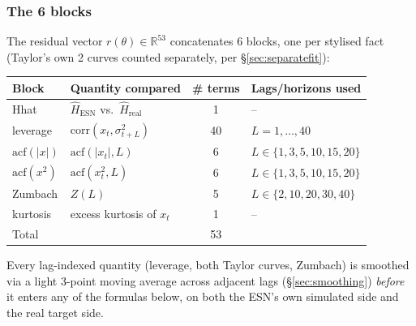 \documentclass[11pt]{article}
\begin{document}
\subsubsection{The 6 blocks}
The residual vector $r(\theta)\in\mathbb R^{53}$ concatenates 6 blocks,
one per stylised fact (Taylor's own 2 curves counted separately, per
\S\ref{sec:separatefit}):
\begin{center}
\begin{tabular}{llcl}
\toprule
Block & Quantity compared & \# terms & Lags/horizons used \\
\midrule
Hhat & $\hat H_{\text{ESN}}$ vs.\ $\hat H_{\text{real}}$ & 1 & -- \\
leverage & $\text{corr}(x_t,\sigma_{t+L}^2)$ & 40 & $L=1,\dots,40$ \\
$\text{acf}(|x|)$ & $\text{acf}(|x_t|,L)$ & 6 & $L\in\{1,3,5,10,15,20\}$ \\
$\text{acf}(x^2)$ & $\text{acf}(x_t^2,L)$ & 6 & $L\in\{1,3,5,10,15,20\}$ \\
Zumbach & $Z(L)$ & 5 & $L\in\{2,10,20,30,40\}$ \\
kurtosis & excess kurtosis of $x_t$ & 1 & -- \\
\midrule
Total & & 53 & \\
\bottomrule
\end{tabular}
\end{center}
Every lag-indexed quantity (leverage, both Taylor curves, Zumbach) is
smoothed via a light 3-point moving average across adjacent lags
(\S\ref{sec:smoothing}) \emph{before} it enters any of the formulas
below, on both the ESN's own simulated side and the real target side.
\end{document}
